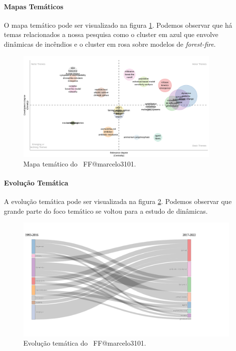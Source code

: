 \paragraph{Mapas Temáticos}

O mapa temático pode ser visualizado na figura \ref{fig:FF@marcelo3101:ThematicMap}. Podemos observar que há temas relacionados a nossa pesquisa como o cluster em azul que envolve dinâmicas de incêndios e o cluster em rosa sobre modelos de \textit{forest-fire}.

\begin{figure}
    \centering
    \includegraphics[width=0.9\textwidth]{exploratory-data-analysis/marcelo3101/PesqBibliogr/ForestFire/WoS-20221204/assets/ThematicMap.png}
    \caption{Mapa temático do  \dataset\ FF@marcelo3101.}
    \label{fig:FF@marcelo3101:ThematicMap}
\end{figure}

\paragraph{Evolução Temática}

A evolução temática pode ser visualizada na figura \ref{fig:FF@marcelo3101:Thematic-Evolution}. Podemos observar que grande parte do foco temático se voltou para a estudo de dinâmicas.

\begin{figure}
    \centering
    \includegraphics[width=1\textwidth]{exploratory-data-analysis/marcelo3101/PesqBibliogr/ForestFire/WoS-20221204/assets/ThematicEvolution.png}
    \caption{Evolução temática do  \dataset\ FF@marcelo3101.}
    \label{fig:FF@marcelo3101:Thematic-Evolution}
\end{figure}

